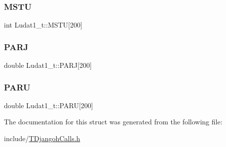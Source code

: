 \subsubsection{\texorpdfstring{M\+S\+TU}{MSTU}}
{\footnotesize\ttfamily int Ludat1\+\_\+t\+::\+M\+S\+TU\mbox{[}200\mbox{]}}

\mbox{\label{struct_ludat1__t_a3c1647b2c9d49467b84324857e22daaf}} 
\subsubsection{\texorpdfstring{P\+A\+RJ}{PARJ}}
{\footnotesize\ttfamily double Ludat1\+\_\+t\+::\+P\+A\+RJ\mbox{[}200\mbox{]}}

\mbox{\label{struct_ludat1__t_acde27cfd0ebacc6b76cdcb339044c627}} 
\subsubsection{\texorpdfstring{P\+A\+RU}{PARU}}
{\footnotesize\ttfamily double Ludat1\+\_\+t\+::\+P\+A\+RU\mbox{[}200\mbox{]}}



The documentation for this struct was generated from the following file\+:\begin{DoxyCompactItemize}
\item 
include/\hyperlink{_t_djangoh_calls_8h}{T\+Djangoh\+Calls.\+h}\end{DoxyCompactItemize}
